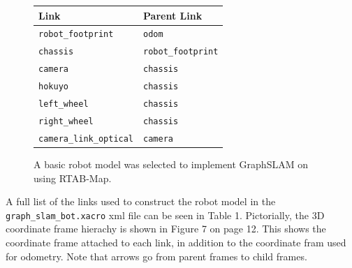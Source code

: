 \documentclass[a4paper]{article}
\begin{document}
\begin{figure}[h]
\begin{minipage}{0.45\textwidth}
	\centering
	\caption{A basic robot model was selected to implement GraphSLAM on using RTAB-Map.}
\end{minipage}
\hspace{1cm}
\begin{minipage}{0.45\textwidth}
	\begin{tabular}{ll}
		\toprule
		\textbf{Link} & \textbf{Parent Link} \\
		\midrule
		\texttt{robot\_footprint} & \texttt{odom} \\
		\texttt{chassis} & \texttt{robot\_footprint} \\
		\texttt{camera} & \texttt{chassis} \\
		\texttt{hokuyo} & \texttt{chassis} \\
		\texttt{left\_wheel} & \texttt{chassis} \\
		\texttt{right\_wheel} & \texttt{chassis} \\
		\texttt{camera\_link\_optical} & \texttt{camera} \\
		\bottomrule
	\end{tabular}
\end{minipage}
\end{figure}

A full list of the links used to construct the robot model in the \texttt{graph\_slam\_bot.xacro} xml file can be seen in Table 1. Pictorially, the 3D coordinate frame hierachy is shown in Figure 7 on page 12. This shows the coordinate frame attached to each link, in addition to the coordinate fram used for odometry. Note that arrows go from parent frames to child frames.
\end{document}
